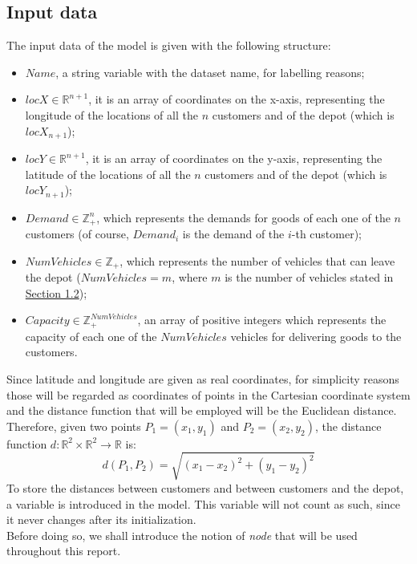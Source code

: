\documentclass[../main.tex]{subfiles}
\begin{document}
\subsection{Input data}
\label{subsec:input-data}
The input data of the model is given with the following structure:
\begin{itemize}
    \item $Name$, a string variable with the dataset name, for labelling reasons;
    \item $locX \in \mathbb{R}^{n+1}$, it is an array of coordinates on the x-axis, representing the longitude of the locations of all the $n$ customers and of the depot (which is $locX_{n+1}$);
    \item $locY \in \mathbb{R}^{n+1}$, it is an array of coordinates on the y-axis, representing the latitude of the locations of all the $n$ customers and of the depot (which is $locY_{n+1}$);
    \item $Demand \in \mathbb{Z}_+^n$, which represents the demands for goods of each one of the $n$ customers (of course, $Demand_i$ is the demand of the $i$-th customer);
    \item $NumVehicles \in \mathbb{Z}_+$, which represents the number of vehicles that can leave the depot ($NumVehicles = m$, where $m$ is the number of vehicles stated in \hyperref[subsec:formal-problem-definition]{Section 1.2});
    \item $Capacity \in \mathbb{Z}_+^{NumVehicles}$, an array of positive integers which represents the capacity of each one of the $NumVehicles$ vehicles for delivering goods to the customers.
\end{itemize}
\noindent
Since latitude and longitude are given as real coordinates, for simplicity reasons those will be regarded as coordinates of points in the Cartesian coordinate system and the distance function that will be employed will be the Euclidean distance.\\
Therefore, given two points $P_1 = (x_1, y_1)$ and $P_2 = (x_2, y_2)$, the distance function $d: \mathbb{R}^2 \times \mathbb{R}^2 \rightarrow \mathbb{R}$ is: $$d(P_1, P_2) = \sqrt{(x_1 - x_2)^2+(y_1 - y_2)^2}$$
To store the distances between customers and between customers and the depot, a variable is introduced in the model. This variable will not count as such, since it never changes after its initialization.\\
Before doing so, we shall introduce the notion of \textit{node} that will be used throughout this report.\\
\end{document}
